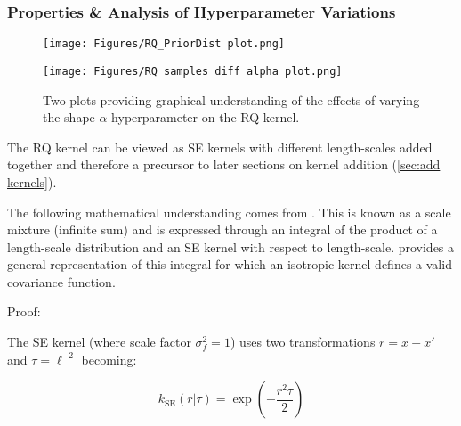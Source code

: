 \documentclass[12pt,a4paper]{article}
\begin{document}
\subsubsection{Properties \& Analysis of Hyperparameter Variations}
\label{sec:RQ prop}


\begin{figure}[h]
    \centering

    \begin{minipage}{0.45\textwidth}
        \centering
        \texttt{[image: Figures/RQ\_PriorDist plot.png]} %
        \label{fig:RQ_PriorDist plot}
    \end{minipage} 
    \begin{minipage}{0.45\textwidth}
        \centering
        \texttt{[image: Figures/RQ samples diff alpha plot.png]} %
        \label{fig:RQ samples diff alpha plot}
    \end{minipage}
    \caption{Two plots providing graphical understanding of the effects of varying the shape \(\alpha\) hyperparameter on the RQ kernel.}
    \label{fig:RQ varying hyperparameter plots}
\end{figure}

The RQ kernel can be viewed as SE kernels with different length-scales added together \citep{torontoKernelCookbook} and therefore a precursor to later sections on kernel addition (\ref{sec:add kernels}). 

The following mathematical understanding comes from \citet{williams2006gaussian}. This is known as a scale mixture (infinite sum) and is expressed through an integral of the product of a length-scale distribution and an SE kernel with respect to length-scale. \citet[see sec. 2.10]{stein1999interpolation} provides a general representation of this integral for which an isotropic kernel defines a valid covariance function. 

Proof:

The SE kernel (where scale factor \(\sigma_f^2 = 1\)) uses two transformations \(r=x-x'\) and \(\tau = \ell^{-2}\) becoming:

\begin{equation}
k_{\text{SE}}(r|\tau) = \exp\left(-\frac{r^2 \tau}{2}\right)
\label{eq:SE k(r|tau)}
\end{equation}
\end{document}

